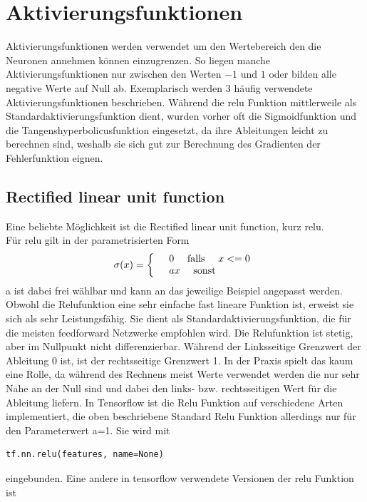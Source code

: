 \section{Aktivierungsfunktionen}
Aktivierungsfunktionen werden verwendet um den Wertebereich den die Neuronen annehmen können einzugrenzen. So liegen manche Aktivierungsfunktionen nur zwischen den Werten $-1$ und $1$ oder bilden alle negative Werte auf Null ab. Exemplarisch werden 3 häufig verwendete Aktivierungsfunktionen beschrieben.
Während die relu Funktion mittlerweile als Standardaktivierungsfunktion dient, wurden vorher oft die Sigmoidfunktion und die Tangenshyperbolicusfunktion eingesetzt, da ihre Ableitungen leicht zu berechnen sind, weshalb sie sich gut zur Berechnung des Gradienten der Fehlerfunktion eignen.
\subsection{Rectified linear unit function}
Eine beliebte Möglichkeit ist die Rectified linear unit function, kurz relu.\\
Für relu gilt in der parametrisierten Form\cite{Goodfellow}
\begin{align*}
\sigma(x)=
\left\{
\begin{array}{l l}
& 0 \quad \text{   falls  } \quad x <= 0  \\ 
& ax \quad \text{   sonst}
\end{array}
\right.
\end{align*}
a ist dabei frei wählbar und kann an das jeweilige Beispiel angepasst werden. Obwohl die Relufunktion eine sehr einfache fast lineare Funktion ist, erweist sie sich als sehr Leistungsfähig. Sie dient als Standardaktivierungsfunktion, die für die meisten feedforward Netzwerke empfohlen wird.\cite{Goodfellow} 
Die Relufunktion ist stetig, aber im Nullpunkt nicht differenzierbar.\cite{cookbook} Während der Linksseitige Grenzwert der Ableitung 0 ist, ist der rechtsseitige Grenzwert 1. In der Praxis spielt das kaum eine Rolle, da während des Rechnens meist Werte verwendet werden die nur sehr Nahe an der Null sind und dabei den links- bzw. rechtsseitigen Wert für die Ableitung liefern.\cite{Goodfellow} In Tensorflow ist die Relu Funktion auf verschiedene Arten implementiert, die oben beschriebene Standard Relu Funktion allerdings nur für den Parameterwert a=1. Sie wird mit \cite{cookbook}
\begin{lstlisting}
tf.nn.relu(features, name=None)
\end{lstlisting} 
eingebunden.
Eine andere in tensorflow verwendete Versionen der relu Funktion ist \cite{cookbook}
